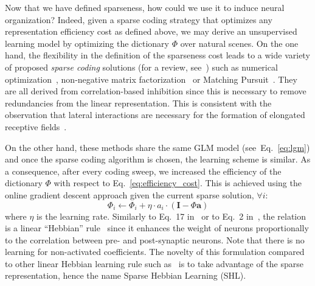 \documentclass[a4paper, 11pt]{book}
\newcommand{\image}{\mathbf{I}} %
\newcommand{\dico}{\Phi} %
\newcommand{\coef}{\mathbf{a}} %
\newcommand\la{\leftarrow} %
\newcommand{\seeEq}[1]{Eq.~\ref{eq:#1}}%
\begin{document}
Now that we have defined sparseness, how could we use it to induce neural organization?
Indeed, given a sparse coding strategy that optimizes any representation efficiency cost as defined above, we may derive an unsupervised learning model by optimizing the dictionary $\dico$ over natural scenes. On the one hand, the flexibility in the definition of the sparseness cost leads to a wide variety of proposed \emph{sparse coding} solutions (for a review, see~\citep{Pece02}) such as numerical optimization~\citep{Olshausen97}, non-negative matrix factorization~\citep{Lee99,Ranzato07} or Matching Pursuit~\citep{Perrinet03ieee,Smith06,Rehn07,Perrinet10shl}. They are all derived from correlation-based inhibition since this is necessary to remove redundancies from the linear representation. This is consistent with the observation that lateral interactions are necessary for the formation of elongated receptive fields~\citep{Bolz89,Wolfe10}.

On the other hand, these methods share the same GLM model (see~\seeEq{lgm}) and once the sparse coding algorithm is chosen, the learning scheme is similar.
As a consequence, after every coding sweep, we increased the efficiency of the dictionary $\dico$  with respect to \seeEq{efficiency_cost}. This is achieved using  the online gradient descent approach given the current sparse solution,  $\forall i$:
\begin{equation}%
\dico_{i} \la \dico_{i} + \eta \cdot a_{i} \cdot (\image - \dico\coef)%
\label{eq:learn}%
\end{equation}%
where $\eta$ is the learning rate. %
Similarly to Eq.~17 in~\citep{Olshausen97} or to Eq.~2 in~\citep{Smith06}, the relation is a linear ``Hebbian'' rule~\citep{Hebb49} since it enhances the weight of neurons proportionally to the correlation between pre- and post-synaptic neurons. Note that there is no learning for non-activated coefficients. The novelty of this formulation compared to other linear Hebbian learning rule such as~\citep{Oja82} is to take advantage of the sparse representation, hence the name Sparse Hebbian Learning (SHL).%
\end{document}
